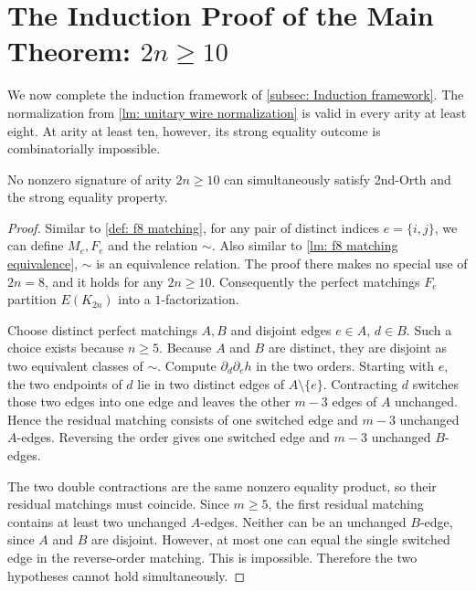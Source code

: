 \section{The Induction Proof of the Main Theorem: \texorpdfstring{$2n\ge 10$}{2n >= 10}}
\label{sec: 2n >= 10}
\label{sec: high arity induction}

We now complete the induction framework of
\cref{subsec: Induction framework}.  The normalization from
\cref{lm: unitary wire normalization} is valid in every arity at least
eight.  At arity at least ten, however, its strong equality outcome is
combinatorially impossible.

\begin{lemma}
\label{lm: high arity equality rigidity}
No nonzero signature of arity $2n\geq10$ can simultaneously satisfy
{\sc 2nd-Orth} and the strong equality property.
\end{lemma}

\begin{proof}
Similar to \cref{def: f8 matching}, for any pair of distinct indices $e=\{i,j\}$, we can define $M_e, F_e$ and the relation $\sim.$
Also similar to \cref{lm: f8 matching equivalence}, $\sim$ is an equivalence relation.
The proof there makes no special use of $2n=8$, and it holds for any $2n\ge10.$
Consequently the perfect matchings $F_e$ partition $E(K_{2n})$ into a
$1$-factorization.

Choose distinct perfect matchings $A,B$ and disjoint edges $e\in A$, $d\in B$.
Such a choice exists because $n\geq5$.  
Because $A$ and $B$ are distinct, they are disjoint as two equivalent classes of $\sim.$
Compute $\partial_d\partial_eh$ in the two orders.  Starting with $e$, the two
endpoints of $d$ lie in two distinct edges of $A\setminus\{e\}$.
Contracting $d$ switches those two edges into one edge and leaves the
other $m-3$ edges of $A$ unchanged.  Hence the residual matching consists of one switched edge and $m-3$ unchanged $A$-edges.  Reversing the order
gives one switched edge and $m-3$ unchanged $B$-edges.

The two double contractions are the same nonzero equality product, so
their residual matchings must coincide.  
Since $m\geq5$, the first residual
matching contains at least two unchanged $A$-edges.  
Neither can be an unchanged $B$-edge, since $A$ and $B$ are disjoint.
However, at most one can equal the single switched edge
in the reverse-order matching.  This is impossible.  Therefore the two
hypotheses cannot hold simultaneously.
\end{proof}

